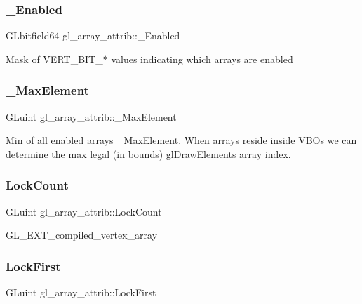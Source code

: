 \subsubsection{\texorpdfstring{\+\_\+\+Enabled}{\_Enabled}}
{\footnotesize\ttfamily G\+Lbitfield64 gl\+\_\+array\+\_\+attrib\+::\+\_\+\+Enabled}

Mask of V\+E\+R\+T\+\_\+\+B\+I\+T\+\_\+$\ast$ values indicating which arrays are enabled \mbox{\label{structgl__array__attrib_a3762aeca3258054df5c9dbd0dbd8a52c}} 
\subsubsection{\texorpdfstring{\+\_\+\+Max\+Element}{\_MaxElement}}
{\footnotesize\ttfamily G\+Luint gl\+\_\+array\+\_\+attrib\+::\+\_\+\+Max\+Element}

Min of all enabled arrays\textquotesingle{} \+\_\+\+Max\+Element. When arrays reside inside V\+B\+Os we can determine the max legal (in bounds) gl\+Draw\+Elements array index. \mbox{\label{structgl__array__attrib_abb535ffa5048098b6048e8ae87ba05f2}} 
\subsubsection{\texorpdfstring{Lock\+Count}{LockCount}}
{\footnotesize\ttfamily G\+Luint gl\+\_\+array\+\_\+attrib\+::\+Lock\+Count}

G\+L\+\_\+\+E\+X\+T\+\_\+compiled\+\_\+vertex\+\_\+array \mbox{\label{structgl__array__attrib_a1493fecf20e998e0c80376bdf3e7ef51}} 
\subsubsection{\texorpdfstring{Lock\+First}{LockFirst}}
{\footnotesize\ttfamily G\+Luint gl\+\_\+array\+\_\+attrib\+::\+Lock\+First}

